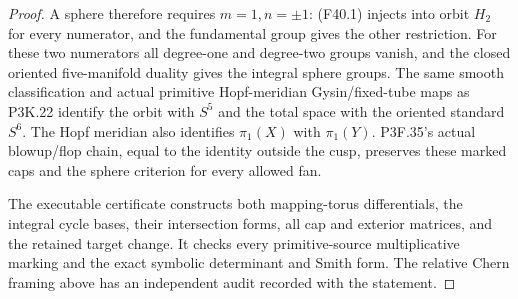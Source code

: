 \begin{proof}
A sphere therefore requires $m=1,n=\pm1$: (F40.1) injects
into orbit $H_2$ for every numerator, and the fundamental group
gives the other restriction. For these two numerators all
degree-one and degree-two groups vanish, and the closed oriented
five-manifold duality gives the integral sphere groups. The
same smooth classification and actual primitive Hopf-meridian
Gysin/fixed-tube maps as P3K.22 identify the orbit with $S^5$
and the total space with the oriented standard $S^6$.
The Hopf meridian also identifies $\pi_1(X)$ with $\pi_1(Y)$.
P3F.35's actual blowup/flop chain, equal to the identity outside
the cusp, preserves these marked caps and the sphere criterion
for every allowed fan.

The executable certificate
constructs both mapping-torus differentials, the integral cycle
bases, their intersection forms, all cap and exterior matrices,
and the retained target change. It checks every primitive-source
multiplicative marking and the exact symbolic determinant and
Smith form. The relative Chern framing above has an independent
audit recorded with the statement.
\end{proof}
